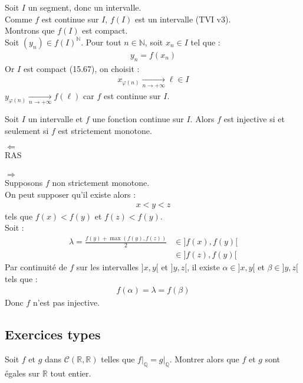 \documentclass[titlepage, twoside]{report}
\begin{document}
\noindent Soit $I$ un segment, donc un intervalle. \\
Comme $f$ est continue sur $I$, $f(I)$ est un intervalle (TVI v3). \\
Montrons que $f(I)$ est compact. \\
Soit $(y_n) \in f(I)^{\mathbb{N}}$. Pour tout $n \in \mathbb{N}$, soit $x_n \in I$ tel que : 
\begin{align*}
    y_n = f(x_n)
\end{align*}
Or $I$ est compact (15.67), on choisit : 
\begin{align*}
    x_{\varphi(n)} \underset{n \to +\infty}{\longrightarrow} \ell \in I
\end{align*}
$y_{\varphi(n)} \underset{n \to +\infty}{\longrightarrow} f(\ell)$ car $f$ est continue sur $I$. 

\begin{tcolorbox}[title=Théorème 15.72, title filled=false, colframe=orange, colback=orange!10!white]
    Soit $I$ un intervalle et $f$ une fonction continue sur $I$. Alors $f$ est injective si et seulement si $f$ est strictement monotone. 
\end{tcolorbox}

$\boxed{\Leftarrow}$ \\
RAS \\ \\

$\boxed{\Rightarrow}$ \\
Supposons $f$ non strictement monotone. \\
On peut supposer qu'il existe alors : 
\begin{align*}
    x < y < z
\end{align*}
tels que $f(x) < f(y)$ et $f(z) < f(y)$. \\
Soit :
\begin{align*}
    \lambda = \frac{f(y) + \max(f(y), f(z))}{2} &\in ]f(x), f(y)[ \\
    &\in ]f(z), f(y)[
\end{align*}
Par continuité de $f$ sur les intervalles $]x, y[$ et $]y, z[$, il existe $\alpha \in ]x, y[$ et $\beta \in ]y, z[$ tels que : 
\begin{align*}
    f(\alpha) = \lambda = f(\beta)
\end{align*}
Donc $f$ n'est pas injective. 


\subsection{Exercices types}
\begin{tcolorbox}[title=Exercice 1, title filled=false, colframe=darkgreen, colback=darkgreen!10!white]
    Soit $f$ et $g$ dans $\mathcal{C}(\mathbb{R}, \mathbb{R})$ telles que $\left. f \right|_{\mathbb{Q}} = \left. g \right|_{\mathbb{Q}}$. Montrer alors que $f$ et $g$ sont égales sur $\mathbb{R}$ tout entier. 
\end{tcolorbox}
\end{document}
